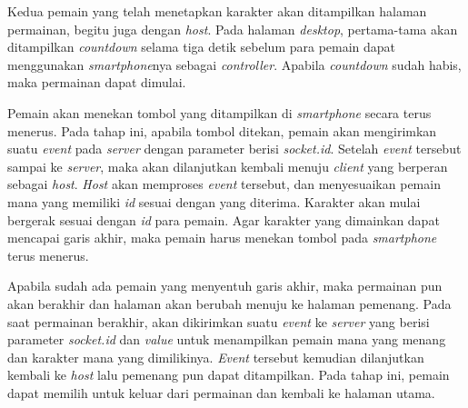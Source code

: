 
Kedua pemain yang telah menetapkan karakter akan ditampilkan halaman permainan, begitu juga dengan \textit{host}. Pada halaman \textit{desktop}, pertama-tama akan ditampilkan \textit{countdown} selama tiga detik sebelum para pemain dapat menggunakan \textit{smartphone}nya sebagai \textit{controller}. Apabila \textit{countdown} sudah habis, maka permainan dapat dimulai.

Pemain akan menekan tombol yang ditampilkan di \textit{smartphone} secara terus menerus. Pada tahap ini, apabila tombol ditekan, pemain akan mengirimkan suatu \textit{event} pada \textit{server} dengan parameter berisi \textit{socket.id}. Setelah \textit{event} tersebut sampai ke \textit{server}, maka akan dilanjutkan kembali menuju \textit{client} yang berperan sebagai \textit{host}. \textit{Host} akan memproses \textit{event} tersebut, dan menyesuaikan pemain mana yang memiliki \textit{id} sesuai dengan yang diterima. Karakter akan mulai bergerak sesuai dengan \textit{id} para pemain. Agar karakter yang dimainkan dapat mencapai garis akhir, maka pemain harus menekan tombol pada \textit{smartphone} terus menerus.


Apabila sudah ada pemain yang menyentuh garis akhir, maka permainan pun akan berakhir dan halaman akan berubah menuju ke halaman pemenang. Pada saat permainan berakhir, akan dikirimkan suatu \textit{event} ke \textit{server} yang berisi parameter \textit{socket.id} dan \textit{value} untuk menampilkan pemain mana yang menang dan karakter mana yang dimilikinya. \textit{Event} tersebut kemudian dilanjutkan kembali ke \textit{host} lalu pemenang pun dapat ditampilkan. Pada tahap ini, pemain dapat memilih untuk keluar dari permainan dan kembali ke halaman utama.



